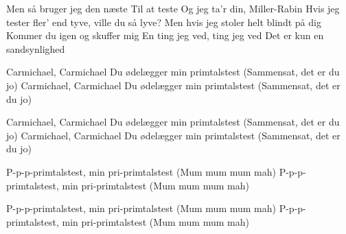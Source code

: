 \documentclass[a4paper,11pt]{article}
\begin{document}
\begin{song}
 Men så bruger jeg den næste
Til at teste
Og jeg ta'r din, Miller-Rabin
Hvis jeg tester fler' end tyve, ville du så lyve?
Men hvis jeg stoler helt blindt på dig
Kommer du igen og skuffer mig
En ting jeg ved, ting jeg ved
Det er kun en sandsynlighed

 Carmichael, Carmichael
Du ødelægger min primtalstest
 (Sammensat, det er du jo)
 Carmichael, Carmichael
Du ødelægger min primtalstest
 (Sammensat, det er du jo)

 Carmichael, Carmichael
Du ødelægger min primtalstest
 (Sammensat, det er du jo)
 Carmichael, Carmichael
Du ødelægger min primtalstest
 (Sammensat, det er du jo)

 P-p-p-primtalstest, min pri-primtalstest
 (Mum mum mum mah)
 P-p-p-primtalstest, min pri-primtalstest
 (Mum mum mum mah)

 P-p-p-primtalstest, min pri-primtalstest
 (Mum mum mum mah)
 P-p-p-primtalstest, min pri-primtalstest
 (Mum mum mum mah)
\end{song}
\end{document}
